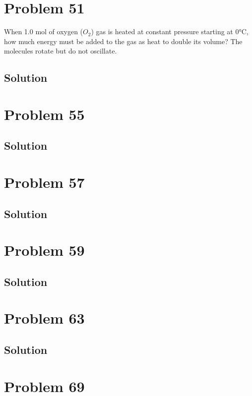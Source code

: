 \documentclass[12pt]{article}
\begin{document}
    \pagebreak
    \section{Problem 51}
        When 1.0 mol of oxygen ($O_2$) gas is heated at constant pressure starting at 0°C, how much energy must be added to the gas as heat to double its volume? 
        The molecules rotate but do not oscillate.

        \subsection{Solution}

    \pagebreak
    \section{Problem 55}

        \subsection{Solution}

    \pagebreak
    \section{Problem 57}

        \subsection{Solution}

    \pagebreak
    \section{Problem 59}

        \subsection{Solution}

    \pagebreak
    \section{Problem 63}

        \subsection{Solution}

    \pagebreak
    \section{Problem 69}
\end{document}

